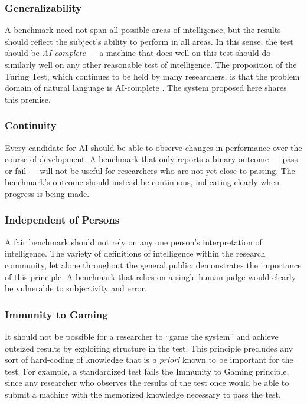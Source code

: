 \subsubsection{Generalizability}
A benchmark need not span all possible areas of intelligence, but the results should reflect the subject's ability to perform in all areas. In this sense, the test should be \textit{AI-complete} --- a machine that does well on this test should do similarly well on any other reasonable test of intelligence. The proposition of the Turing Test, which continues to be held by many researchers, is that the problem domain of natural language is AI-complete \citep{yampolskiy2013turing, weston2015towards}. The system proposed here shares this premise.

\subsubsection{Continuity}
Every candidate for AI should be able to observe changes in performance over the course of development. A benchmark that only reports a binary outcome --- pass or fail --- will not be useful for researchers who are not yet close to passing. The benchmark's outcome should instead be continuous, indicating clearly when progress is being made.

\subsubsection{Independent of Persons}
A fair benchmark should not rely on any one person's interpretation of intelligence. The variety of definitions of intelligence within the research community, let alone throughout the general public, demonstrates the importance of this principle. A benchmark that relies on a single human judge would clearly be vulnerable to subjectivity and error.

\subsubsection{Immunity to Gaming}
It should not be possible for a researcher to ``game the system'' and achieve outsized results by exploiting structure in the test. This principle precludes any sort of hard-coding of knowledge that is \textit{a priori} known to be important for the test. For example, a standardized test fails the Immunity to Gaming principle, since any researcher who observes the results of the test once would be able to submit a machine with the memorized knowledge necessary to pass the test. 

